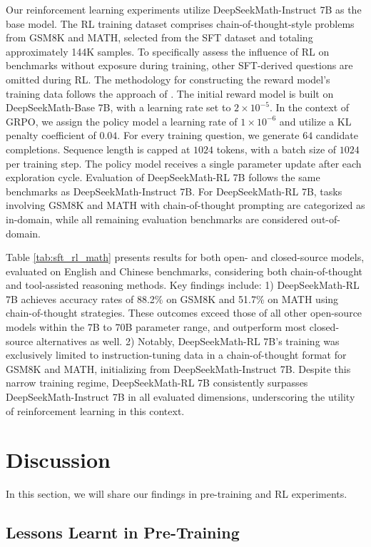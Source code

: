 \begin{itemize}[topsep=0pt]
\begin{itemize}[topsep=0pt]
Our reinforcement learning experiments utilize DeepSeekMath-Instruct 7B as the base model. The RL training dataset comprises chain-of-thought-style problems from GSM8K and MATH, selected from the SFT dataset and totaling approximately 144K samples. To specifically assess the influence of RL on benchmarks without exposure during training, other SFT-derived questions are omitted during RL. The methodology for constructing the reward model’s training data follows the approach of \citep{wang2023math}. The initial reward model is built on DeepSeekMath-Base 7B, with a learning rate set to $2\times10^{-5}$. In the context of GRPO, we assign the policy model a learning rate of $1\times10^{-6}$ and utilize a KL penalty coefficient of $0.04$. For every training question, we generate $64$ candidate completions. Sequence length is capped at $1024$ tokens, with a batch size of $1024$ per training step. The policy model receives a single parameter update after each exploration cycle. Evaluation of DeepSeekMath-RL 7B follows the same benchmarks as DeepSeekMath-Instruct 7B. For DeepSeekMath-RL 7B, tasks involving GSM8K and MATH with chain-of-thought prompting are categorized as in-domain, while all remaining evaluation benchmarks are considered out-of-domain.

Table \ref{tab:sft_rl_math} presents results for both open- and closed-source models, evaluated on English and Chinese benchmarks, considering both chain-of-thought and tool-assisted reasoning methods. Key findings include: 1) DeepSeekMath-RL 7B achieves accuracy rates of 88.2\% on GSM8K and 51.7\% on MATH using chain-of-thought strategies. These outcomes exceed those of all other open-source models within the 7B to 70B parameter range, and outperform most closed-source alternatives as well. 2) Notably, DeepSeekMath-RL 7B's training was exclusively limited to instruction-tuning data in a chain-of-thought format for GSM8K and MATH, initializing from DeepSeekMath-Instruct 7B. Despite this narrow training regime, DeepSeekMath-RL 7B consistently surpasses DeepSeekMath-Instruct 7B in all evaluated dimensions, underscoring the utility of reinforcement learning in this context.

\section{Discussion}
In this section, we will share our findings in pre-training and RL experiments. 

\subsection{Lessons Learnt in Pre-Training}


\end{itemize}
\end{itemize}
